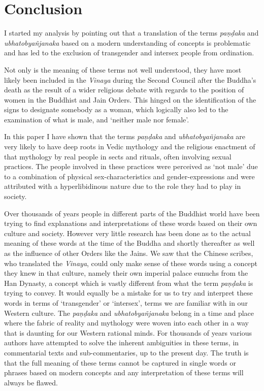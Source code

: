 \section{Conclusion}
I started my analysis by pointing out that a translation of the terms {\em paṇḍaka} and {\em ubhatob­yañ­janaka} based on a modern understanding of concepts is problematic and has led to the exclusion of transgender and intersex people from ordination.

Not only is the meaning of these terms not well understood, they have most likely been included in the {\em Vinaya} during the Second Council after the Buddha's death as the result of a wider religious debate with regards to the position of women in the Buddhist and Jain Orders. This hinged on the identification of the signs to designate somebody as a woman, which logically also led to the examination of what is male, and `neither male nor female'.

In this paper I have shown that the terms {\em paṇḍaka} and {\em ubhatob­yañ­janaka} are very likely to have deep roots in Vedic mythology and the religious enactment of that mythology by real people in sects and rituals, often involving sexual practices. The people involved in these practices were perceived as `not male' due to a combination of physical sex-characteristics and gender-expressions and were attributed with a hyperlibidinous nature due to the role they had to play in society.

Over thousands of years people in different parts of the Buddhist world have been trying to find explanations and interpretations of these words based on their own culture and society. However very little research has been done as to the actual meaning of these words at the time of the Buddha and shortly thereafter as well as the influence of other Orders like the Jains. We saw that the Chinese scribes, who translated the {\em Vinaya}, could only make sense of these words using a concept they knew in that culture, namely their own imperial palace eunuchs from the Han Dynasty, a concept which is vastly different from what the term {\em paṇḍaka} is trying to convey. It would equally be a mistake for us to try and interpret these words in terms of `transgender' or `intersex', terms we are familiar with in our Western culture. The {\em paṇḍaka} and {\em ubhatob­yañ­janaka} belong in a time and place where the fabric of reality and mythology were woven into each other in a way that is daunting for our Western rational minds. For thousands of years various authors have attempted to solve the inherent ambiguities in these terms, in commentarial texts and sub-commentaries, up to the present day. The truth is that the full meaning of these terms cannot be captured in single words or phrases based on modern concepts and any interpretation of these terms will always be flawed.

